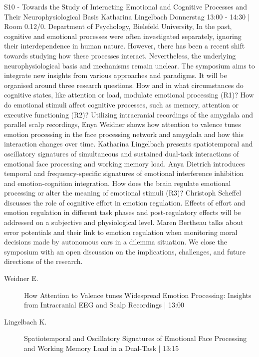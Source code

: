 
            \begin{symposium}
            {S10 - Towards the Study of Interacting Emotional and Cognitive Processes and Their Neurophysiological Basis}
            {Katharina Lingelbach}
            {Donnerstag 13:00 - 14:30 | Room 0.12/0.}
            {Department of Psychology, Bielefeld University,}
            In the past, cognitive and emotional processes were often investigated separately, ignoring their interdependence in human nature. However, there has been a recent shift towards studying how these processes interact. Nevertheless, the underlying neurophysiological basis and mechanisms remain unclear.
The symposium aims to integrate new insights from various approaches and paradigms. It will be organised around three research questions. How and in what circumstances do cognitive states, like attention or load, modulate emotional processing (R1)? How do emotional stimuli affect cognitive processes, such as memory, attention or executive functioning (R2)?
Utilizing intracranial recordings of the amygdala and parallel scalp recordings, Enya Weidner shows how attention to valence tunes emotion processing in the face processing network and amygdala and how this interaction changes over time. Katharina Lingelbach presents spatiotemporal and oscillatory signatures of simultaneous and sustained dual-task interactions of emotional face processing and working memory load. Anya Dietrich introduces temporal and frequency-specific signatures of emotional interference inhibition and emotion-cognition integration.
How does the brain regulate emotional processing or alter the meaning of emotional stimuli (R3)?
Christoph Scheffel discusses the role of cognitive effort in emotion regulation. Effects of effort and emotion regulation in different task phases and post-regulatory effects will be addressed on a subjective and physiological level. Maren Bertheau talks about error potentials and their link to emotion regulation when monitoring moral decisions made by autonomous cars in a dilemma situation.
We close the symposium with an open discussion on the implications, challenges, and future directions of the research.
            \begin{description}    
            
                \item [ Weidner E.] How Attention to Valence tunes Widespread Emotion Processing: Insights from Intracranial EEG and Scalp Recordings \textcolor{mygray}{ | 13:00}    
                
                \item [ Lingelbach K.] Spatiotemporal and Oscillatory Signatures of Emotional Face Processing and Working Memory Load in a Dual-Task \textcolor{mygray}{ | 13:15}    
                

\end{description}
\end{symposium}
